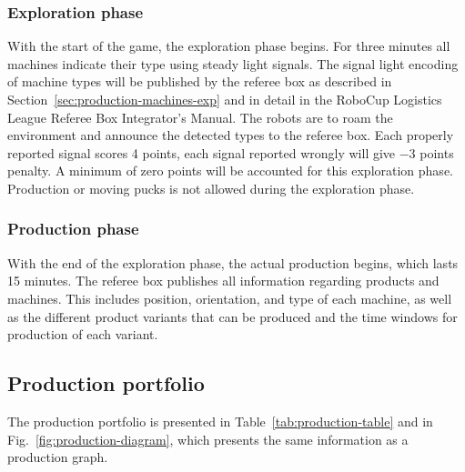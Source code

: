 \documentclass[12pt,twoside]{article}
\newcommand{\mytable}[1]{\savebox{\myt}{#1}\tikz\node[fill=gray!25!white]{\usebox{\myt}};}
\newcommand{\refsec}[1]{Section~\ref{#1}}
\begin{document}
\subsubsection{Exploration phase}
\label{sec:expphase}
%
With the start of the game, the exploration phase begins. For three
minutes all machines indicate their type using steady light
signals. The signal light encoding of machine types will be published
by the referee box as described in
\refsec{sec:production-machines-exp} and in detail in the RoboCup
Logistics League Referee Box Integrator's Manual. The robots are to
roam the environment and announce the detected types to the referee
box.  Each properly reported signal scores \num{+4} points, each
signal reported wrongly will give \num{-3} points penalty. A minimum
of zero points will be accounted for this exploration
phase. Production or moving pucks is not allowed during the
exploration phase.


\subsubsection{Production phase}
\label{sec:production-phase}

With the end of the exploration phase, the actual production begins,
which lasts \num{15} minutes. The referee box publishes all information
regarding products and machines. This includes position, orientation,
and type of each machine, as well as the different product variants
that can be produced and the time windows for production of each
variant. 


\subsection{Production portfolio}
\label{sec:prodportfolio}

The production portfolio is presented in
Table~\ref{tab:production-table} and in
Fig.~\ref{fig:production-diagram}, which presents the same information
as a production graph.



\end{document}
